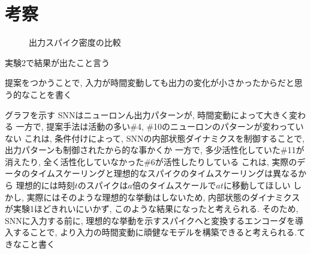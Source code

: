 \section{考察}

\begin{figure*}
    \centering
    \parbox{1.0\linewidth}{
        \centering

        \begin{minipage}{.48 \linewidth} %
            \centering
            
            \label{sec5:fig:snn}
        \end{minipage}
        \hspace{0.02\linewidth} %
        \begin{minipage}{.48 \linewidth} %
            \centering
            
            \label{sec5:fig:dyna}    
        \end{minipage}    

        \caption{出力スパイク密度の比較}
    }
\end{figure*}

実験2で結果が出たこと言う

提案をつかうことで, 入力が時間変動しても出力の変化が小さかったからだと思う的なことを書く

グラフを示す
SNNはニューロンん出力パターンが, 時間変動によって大きく変わる
一方で, 提案手法は活動の多い\#4, \#10のニューロンのパターンが変わっていない
これは, 条件付けによって, SNNの内部状態ダイナミクスを制御することで, 出力パターンも制御されたから的な事かくか
一方で, 多少活性化していた\#11が消えたり, 全く活性化していなかった\#6が活性したりしている
これは, 実際のデータのタイムスケーリングと理想的なスパイクのタイムスケーリングは異なるから
理想的には時刻$t$のスパイクは$a$倍のタイムスケールで$at$に移動してほしい
しかし, 実際にはそのような理想的な挙動はしないため, 内部状態のダイナミクスが実験1ほどきれいにいかず, このような結果になったと考えられる.
そのため, SNNに入力する前に, 理想的な挙動を示すスパイクへと変換するエンコーダを導入することで, より入力の時間変動に頑健なモデルを構築できると考えられる.てきなこと書く

% 
% 
% 